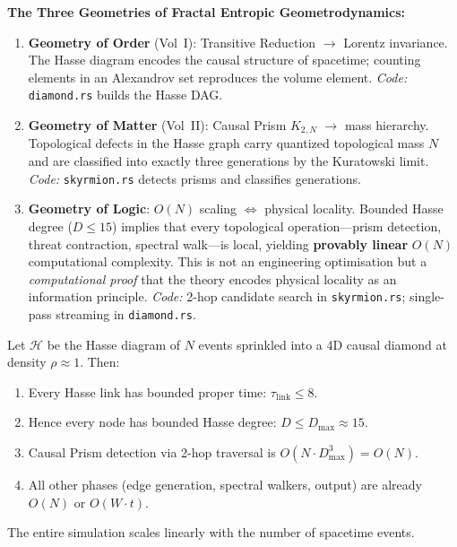 \documentclass[11pt, a4paper, openany]{book}
\newcommand{\code}[1]{\texttt{#1}}
\begin{document}
\begin{result}
\textbf{The Three Geometries of Fractal Entropic Geometrodynamics:}
\begin{enumerate}
  \item \textbf{Geometry of Order} (Vol~I): Transitive Reduction $\to$ Lorentz
        invariance.  The Hasse diagram encodes the causal structure of spacetime;
        counting elements in an Alexandrov set reproduces the volume element.
        \emph{Code:} \code{diamond.rs} builds the Hasse DAG.
  \item \textbf{Geometry of Matter} (Vol~II): Causal Prism $K_{2,N}$ $\to$ mass
        hierarchy.  Topological defects in the Hasse graph carry quantized
        topological mass $N$ and are classified into exactly three generations by
        the Kuratowski limit.
        \emph{Code:} \code{skyrmion.rs} detects prisms and classifies generations.
  \item \textbf{Geometry of Logic}: $O(N)$ scaling $\Leftrightarrow$ physical
        locality.  Bounded Hasse degree ($D \le 15$) implies that every
        topological operation---prism detection, threat contraction, spectral
        walk---is local, yielding \textbf{provably linear} $O(N)$ computational
        complexity.  This is not an engineering optimisation but a
        \emph{computational proof} that the theory encodes physical locality as an
        information principle.
        \emph{Code:} 2-hop candidate search in \code{skyrmion.rs};
        single-pass streaming in \code{diamond.rs}.
\end{enumerate}
\end{result}

\begin{theorem}
Let $\mathcal{H}$ be the Hasse diagram of $N$ events sprinkled into a 4D causal
diamond at density $\rho \approx 1$.  Then:
\begin{enumerate}
  \item Every Hasse link has bounded proper time: $\tau_{\text{link}} \le 8$.
  \item Hence every node has bounded Hasse degree: $D \le D_{\max} \approx 15$.
  \item Causal Prism detection via 2-hop traversal is $O(N \cdot D_{\max}^3) = O(N)$.
  \item All other phases (edge generation, spectral walkers, output) are already
        $O(N)$ or $O(W \cdot t)$.
\end{enumerate}
The entire simulation scales linearly with the number of spacetime events.
\end{theorem}
\end{document}
